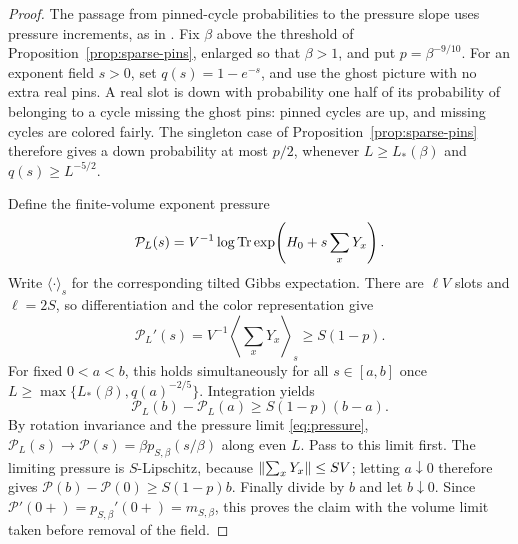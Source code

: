 \begin{proof}
The passage from pinned-cycle probabilities to the pressure slope uses
pressure increments, as in \cite[Section~7]{BL}.  Fix \(\beta\)
above the threshold of Proposition~\ref{prop:sparse-pins}, enlarged
so that \(\beta>1\), and put \(p=\beta^{-9/10}\).  For an exponent
field \(s>0\), set \(q(s)=1-e^{-s}\), and use the ghost picture
with no extra real pins.  A real slot is down with probability one
half of its probability of belonging to a cycle missing the ghost
pins: pinned cycles are up, and missing cycles are colored fairly.
The singleton case of Proposition~\ref{prop:sparse-pins} therefore
gives a down probability at most \(p/2\), whenever
\(L\ge L_*(\beta)\) and \(q(s)\ge L^{-5/2}\).

Define the finite-volume exponent pressure
\[
 \mathcal P_L(s)=V^{-1}\log\operatorname{Tr}
       \exp\!\left(H_0+s\sum_xY_x\right).
\]
Write \(\langle\cdot\rangle_s\) for the corresponding tilted Gibbs
expectation.
There are \(\ell V\) slots and \(\ell=2S\), so differentiation
and the color representation give
\[
 \mathcal P_L'(s)
   =V^{-1}\left\langle\sum_xY_x\right\rangle_s
   \ge S(1-p).
\]
For fixed \(0<a<b\), this holds simultaneously for all
\(s\in[a,b]\) once
\(L\ge\max\{L_*(\beta),q(a)^{-2/5}\}\).  Integration yields
\[
 \mathcal P_L(b)-\mathcal P_L(a)\ge S(1-p)(b-a).
\]
By rotation invariance and the pressure limit \eqref{eq:pressure},
\(\mathcal P_L(s)\to\mathcal P(s)=\beta p_{S,\beta}(s/\beta)\)
along even \(L\).  Pass to this limit first.  The limiting pressure
is \(S\)-Lipschitz, because
\(\lVert\sum_xY_x\rVert\le SV\); letting \(a\downarrow0\) therefore
gives \(\mathcal P(b)-\mathcal P(0)\ge S(1-p)b\).
Finally divide by \(b\) and let \(b\downarrow0\).  Since
\(\mathcal P'(0+)=p_{S,\beta}'(0+)=m_{S,\beta}\), this proves
the claim with the volume limit taken before removal of the field.
\end{proof}

